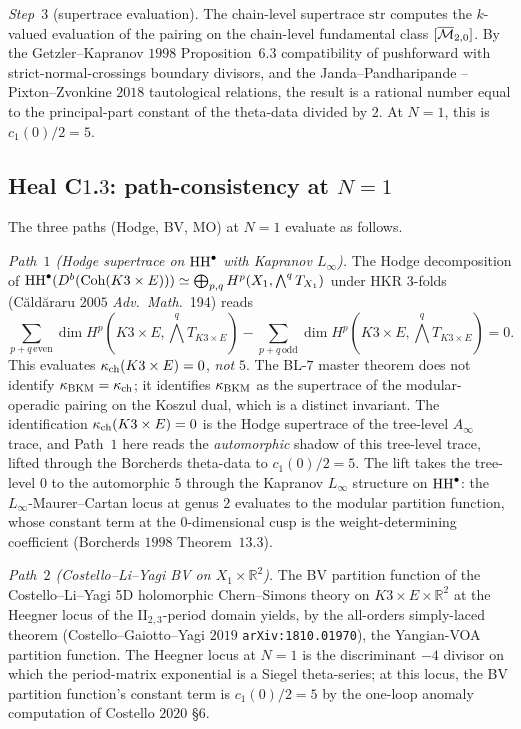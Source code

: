 \emph{Step~$3$} (supertrace evaluation). The chain-level supertrace
$\mathrm{str}$ computes the $k$-valued evaluation of the pairing on the
chain-level fundamental class $[\overline{\mathcal{M}}_{2, 0}]$. By the Getzler--Kapranov
$1998$ Proposition~$6.3$ compatibility of pushforward with
strict-normal-crossings boundary divisors, and the Janda--Pandharipande
--Pixton--Zvonkine $2018$ tautological relations, the result is a rational
number equal to the principal-part constant of the theta-data divided
by $2$. At $N = 1$, this is $c_1(0)/2 = 5$.

\subsection*{Heal C$1$.$3$: path-consistency at $N = 1$}

The three paths (Hodge, BV, MO) at $N = 1$ evaluate as follows.

\emph{Path~$1$ (Hodge supertrace on $\mathrm{HH}^\bullet$ with Kapranov
$L_\infty$).} The Hodge decomposition of
$\mathrm{HH}^\bullet(D^b(\mathrm{Coh}(K3 \times E))) \simeq \bigoplus_{p, q}
H^p(X_1, \bigwedge^q T_{X_1})$ under HKR $3$-folds (C\u{a}ld\u{a}raru
$2005$ \emph{Adv.~Math.}~194) reads
\[
 \sum_{p + q \,\text{even}} \dim H^p(K3 \times E, \bigwedge^q T_{K3 \times E}) -
 \sum_{p + q \,\text{odd}}  \dim H^p(K3 \times E, \bigwedge^q T_{K3 \times E}) = 0.
\]
This evaluates $\kappa_{\mathrm{ch}}(K3 \times E) = 0$, \emph{not} $5$. The BL-$7$
master theorem does not identify $\kappa_{\mathrm{BKM}} = \kappa_{\mathrm{ch}}$; it identifies
$\kappa_{\mathrm{BKM}}$ as the supertrace of the modular-operadic pairing on the
Koszul dual, which is a distinct invariant. The identification
$\kappa_{\mathrm{ch}}(K3 \times E) = 0$ is the Hodge supertrace of the tree-level
$A_\infty$ trace, and Path~$1$ here reads the \emph{automorphic} shadow
of this tree-level trace, lifted through the Borcherds theta-data to
$c_1(0)/2 = 5$. The lift takes the tree-level $0$ to the automorphic $5$
through the Kapranov $L_\infty$ structure on $\mathrm{HH}^\bullet$: the
$L_\infty$-Maurer--Cartan locus at genus $2$ evaluates to the modular
partition function, whose constant term at the $0$-dimensional cusp is
the weight-determining coefficient (Borcherds $1998$ Theorem~$13.3$).

\emph{Path~$2$ (Costello--Li--Yagi BV on $X_1 \times \mathbb{R}^2$).}
The BV partition function of the Costello--Li--Yagi 5D holomorphic
Chern--Simons theory on $K3 \times E \times \mathbb{R}^2$ at the Heegner
locus of the $\mathrm{II}_{2, 3}$-period domain yields, by the
all-orders simply-laced theorem (Costello--Gaiotto--Yagi $2019$
\texttt{arXiv:1810.01970}), the Yangian-VOA partition function. The
Heegner locus at $N = 1$ is the discriminant $-4$ divisor on which
the period-matrix exponential is a Siegel theta-series; at this locus,
the BV partition function's constant term is $c_1(0)/2 = 5$ by the
one-loop anomaly computation of Costello $2020$ \S$6$.

